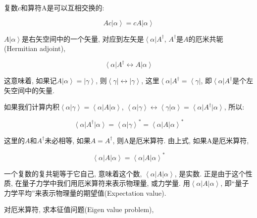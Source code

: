 复数$c$和算符A是可以互相交换的:

\begin{equation*}
Ac \left| \alpha \right\rangle = c A \left| \alpha \right\rangle
\end{equation*}

$A \left| \alpha \right\rangle$是右矢空间中的一个矢量,
对应到左矢是$\left\langle \alpha \right| A^{\dagger}$,
$A^{\dagger}$是$A$的厄米共轭(Hermitian adjoint),

\begin{equation*}
\left\langle \alpha \right| A^{\dagger} \leftrightarrow A \left|
\alpha \right\rangle
\end{equation*}

这意味着, 如果记$A \left| \alpha \right\rangle = \left| \gamma
\right\rangle$, 则$\left\langle \gamma \right| \leftrightarrow
\left| \gamma \right\rangle$, 这里$\left\langle \alpha \right|
A^{\dagger} = \left\langle \gamma \right|$, 即$\left\langle \alpha
\right| A^{\dagger}$是个左矢空间中的矢量.


如果我们计算内积$\left\langle \alpha | \gamma \right\rangle =
\left\langle \alpha | A | \alpha \right\rangle$, $\left\langle
\alpha | \gamma \right\rangle \leftrightarrow \left\langle \gamma |
\alpha \right\rangle = \left\langle \alpha \right| A^{\dagger}
\left| \alpha \right\rangle$, 所以:

\begin{equation*}
\left\langle \alpha \right| A^{\dagger} \left| \alpha \right\rangle
= \left\langle \alpha | \gamma \right\rangle^* = \left\langle \alpha
\right| A \left| \alpha \right\rangle^*
\end{equation*}



这里的$A$和$A^{\dagger}$未必相等, 如果$A = A^{\dagger}$,
则A是厄米算符. 由上式, 如果A是厄米算符,

\begin{equation*}
\left\langle \alpha \right| A \left| \alpha \right\rangle =
\left\langle \alpha \right| A \left| \alpha \right\rangle^*
\end{equation*}

一个复数的复共轭等于它自己, 意味着这个数, $\left\langle \alpha
\right| A \left| \alpha \right\rangle$, 是实数. 正是由于这个性质,
在量子力学中我们用厄米算符来表示物理量, 或力学量. 用$\left\langle
\alpha \right| A \left| \alpha \right\rangle$,
即``量子力学平均''来表示物理量的期望值(Expectation value).

对厄米算符, 求本征值问题(Eigen value problem),

